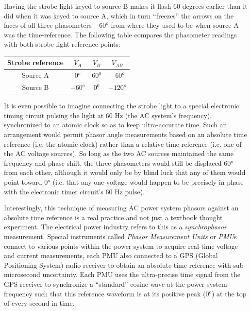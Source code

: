 Having the strobe light keyed to source B makes it flash 60 degrees earlier than it did when it was keyed to source A, which in turn ``freezes'' the arrows on the faces of all three phasometers $-60^{o}$ from where they used to be when source A was the time-reference.  The following table compares the phasometer readings with both strobe light reference points:

\begin{center}
\begin{tabular}{| c | c | c | c |}
\hline 
\textbf{Strobe reference} & $V_A$ & $V_B$ & $V_{AB}$ \\[3pt] \hline
Source A & 0$^{o}$ & 60$^{0}$ & $-60^{o}$ \\[3pt] \hline 
Source B & $-60^{o}$ & 0$^{0}$ & $-120^{o}$ \\[3pt] \hline 
\end{tabular}
\end{center}

It is even possible to imagine connecting the strobe light to a special electronic timing circuit pulsing the light at 60 Hz (the AC system's frequency), synchronized to an atomic clock so as to keep ultra-accurate time.  Such an arrangement would permit phasor angle measurements based on an absolute time reference (i.e. the atomic clock) rather than a relative time reference (i.e. one of the AC voltage sources).  So long as the two AC sources maintained the same frequency and phase shift, the three phasometers would still be displaced 60$^{o}$ from each other, although it would only be by blind luck that any of them would point toward 0$^{o}$ (i.e. that any one voltage would happen to be precisely in-phase with the electronic timer circuit's 60 Hz pulse).

Interestingly, this technique of measuring AC power system phasors against an absolute time reference is a real practice and not just a textbook thought experiment.  The electrical power industry refers to this as a \textit{synchrophasor} measurement.  Special instruments called \textit{Phasor Measurement Units} or \textit{PMU}s connect to various points within the power system to acquire real-time voltage and current measurements, each PMU also connected to a GPS (Global Positioning System) radio receiver to obtain an absolute time reference with sub-microsecond uncertainty.  Each PMU uses the ultra-precise time signal from the GPS receiver to synchronize a ``standard'' cosine wave at the power system frequency such that this reference waveform is at its positive peak (0$^{o}$) at the top of every second in time.        

